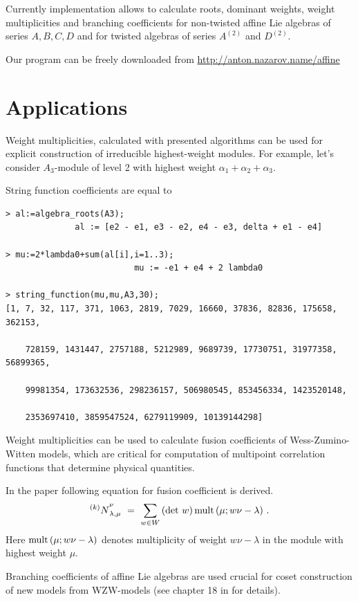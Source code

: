 \documentclass[a4paper,12pt]{article}
\theoremstyle{definition} \newtheorem{Def}{Definition}
\def\la{{\lambda}}\def\al{{\alpha}}\def\be{{\beta}}\def\ga{{\gamma}}
\def\Nk{{{ }^{(k)}N}}\def\Vk{{{ }^{(k)}V}}
\begin{document}
Currently implementation allows to calculate roots, dominant weights,
weight multiplicities and branching coefficients for non-twisted
affine Lie algebras of series $A,B,C,D$ and for twisted algebras of
series $A^{(2)}$ and $D^{(2)}$.

Our program can be freely downloaded from \url{http://anton.nazarov.name/affine}

\section{Applications}
\label{sec:applications}

Weight multiplicities, calculated with presented algorithms can be
used for explicit construction of irreducible highest-weight modules.
For example, let's consider $A_3$-module of level 2 with highest
weight $\alpha_1+\alpha_2+\alpha_3$. 

String function coefficients are equal to
\begin{verbatim}
> al:=algebra_roots(A3);
              al := [e2 - e1, e3 - e2, e4 - e3, delta + e1 - e4]

> mu:=2*lambda0+sum(al[i],i=1..3);
                          mu := -e1 + e4 + 2 lambda0

> string_function(mu,mu,A3,30);
[1, 7, 32, 117, 371, 1063, 2819, 7029, 16660, 37836, 82836, 175658, 362153,

    728159, 1431447, 2757188, 5212989, 9689739, 17730751, 31977358, 56899365,

    99981354, 173632536, 298236157, 506980545, 853456334, 1423520148,

    2353697410, 3859547524, 6279119909, 10139144298]
\end{verbatim}

Weight multiplicities can be used to calculate fusion coefficients of
Wess-Zumino-Witten models, which are critical for computation of
multipoint correlation functions that determine physical quantities. 

In the paper \cite{Walton:1999xc} following equation for fusion
coefficient is derived.
\begin{equation}
  \label{eq:5}
\Nk_{\la,\mu}^\nu\ =\ \sum_{w\in W}\, (\det\,w)\, 
\mult(\mu; w\nu-\la)\ .
 \end{equation}
Here $\mult(\mu; w\nu-\la)$ denotes multiplicity of weight
$w\nu-\lambda$ in the module with highest weight $\mu$.

Branching coefficients of affine Lie algebras are used
crucial for coset construction of new models from WZW-models (see
chapter 18 in \cite{difrancesco1997cft} for details). 
\end{document}
